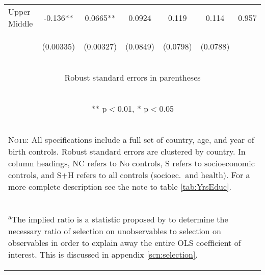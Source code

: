 \documentclass{article}[11pt,subeqn]
\begin{document}
\begin{spacing}{1.5}
\begin{table}[htpb!]
\begin{center}
\begin{tabular}{lcccccc}
Upper Middle &		-0.136**	&	0.0665**	&	0.0924	&	0.119	&	0.114	&	0.957		\\
\vspace{4pt} &	\begin{footnotesize}	(0.00335)	\end{footnotesize} & \begin{footnotesize}	(0.00327)	\end{footnotesize} & \begin{footnotesize}	(0.0849)	\end{footnotesize} & \begin{footnotesize}	(0.0798)	\end{footnotesize} & \begin{footnotesize}	(0.0788)	\end{footnotesize} & \begin{footnotesize}		\end{footnotesize}	\\
\midrule														
\multicolumn{7}{c}{\begin{footnotesize} Robust standard errors in parentheses\end{footnotesize}} \\														
\multicolumn{7}{c}{\begin{footnotesize} ** p$<$0.01, * p$<$0.05 \end{footnotesize}} \\														
\bottomrule														
\multicolumn{7}{p{14.2cm}}{\setstretch{0.9}\begin{footnotesize}\textsc{Note:} All specifications include a full set of country, age, and year of birth controls. Robust 
standard errors are clustered by country. In column headings, NC refers to No controls, S refers to socioeconomic controls, and S+H refers to all controls (socioec.\ and 
health).  For a more complete description see the note to table \ref{tab:YrsEduc}.\end{footnotesize}}\\														
\multicolumn{7}{p{14.2cm}}{\setstretch{0.9}\begin{footnotesize}\textsuperscript{a}The implied ratio is a statistic proposed by \citet{Altonjietal2005} to determine 
the necessary ratio of selection on unobservables to selection on observables in order to explain away the entire OLS coefficient of interest. This is discussed in appendix 
\ref{scn:selection}. \end{footnotesize}}\\														
\end{tabular}														
\end{center}														
\end{table}														



\end{spacing}
\end{document}
